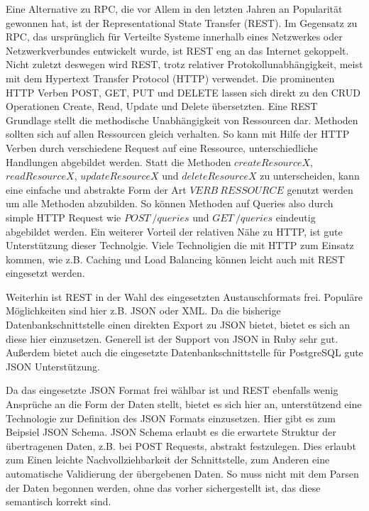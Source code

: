 Eine Alternative zu RPC, die vor Allem in den letzten Jahren an Popularität gewonnen hat, ist der Representational State Transfer (REST). Im Gegensatz zu RPC, das ursprünglich für Verteilte Systeme innerhalb eines Netzwerkes oder Netzwerkverbundes entwickelt wurde\cite{rpc:history}, ist REST eng an das Internet gekoppelt\cite[vgl.][Seite 49]{newman2015building}. Nicht zuletzt deswegen wird REST, trotz relativer Protokollunabhängigkeit, meist mit dem Hypertext Transfer Protocol (HTTP) verwendet\cite[vgl.][Seite 50]{newman2015building}. Die prominenten HTTP Verben POST, GET, PUT und DELETE lassen sich direkt zu den CRUD Operationen Create, Read, Update und Delete übersetzten. Eine REST Grundlage stellt die methodische Unabhängigkeit von Ressourcen dar. Methoden sollten sich auf allen Ressourcen gleich verhalten. So kann mit Hilfe der HTTP Verben durch verschiedene Request auf eine Ressource, unterschiedliche Handlungen abgebildet werden. Statt die Methoden $createResourceX$, $readResourceX$, $updateResourceX$ und $deleteResourceX$ zu unterscheiden, kann eine einfache und abstrakte Form der Art $VERB\ RESSOURCE$ genutzt werden um alle Methoden abzubilden. So können Methoden auf Queries also durch simple HTTP Request wie $POST\ /queries$ und $GET\ /queries$ eindeutig abgebildet werden. Ein weiterer Vorteil der relativen Nähe zu HTTP, ist gute Unterstützung dieser Technolgie. Viele Technoligien die mit HTTP zum Einsatz kommen, wie z.B. Caching und Load Balancing können leicht auch mit REST eingesetzt werden\cite{rest:loadbalancing}.

Weiterhin ist REST in der Wahl des eingesetzten Austauschformats frei\cite[][Seite 53]{newman2015building}. Populäre Möglichkeiten sind hier z.B. JSON oder XML. Da die bisherige Datenbankschnittstelle einen direkten Export zu JSON bietet, bietet es sich an diese hier einzusetzen. Generell ist der Support von JSON in Ruby sehr gut. Außerdem bietet auch die eingesetzte Datenbankschnittstelle\cite{sequel} für PostgreSQL gute JSON Unterstützung.

Da das eingesetzte JSON Format frei wählbar ist und REST ebenfalls wenig Ansprüche an die Form der Daten stellt, bietet es sich hier an, unterstützend eine Technologie zur Definition des JSON Formats einzusetzen. Hier gibt es zum Beipsiel JSON Schema. JSON Schema erlaubt es die erwartete Struktur der übertragenen Daten, z.B. bei POST Requests, abstrakt festzulegen. Dies erlaubt zum Einen leichte Nachvollziehbarkeit der Schnittstelle, zum Anderen eine automatische Validierung der übergebenen Daten. So muss nicht mit dem Parsen der Daten begonnen werden, ohne das vorher sichergestellt ist, das diese semantisch korrekt sind.

